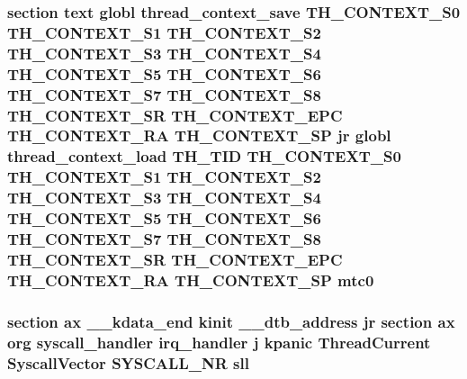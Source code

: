 \hypertarget{mips_2entry_8S_a586efcb1ce14274ebde0a48ee5903ea6}{
\subsubsection[{mtc0}]{\setlength{\rightskip}{0pt plus 5cm}section text globl {\bf thread\-\_\-context\-\_\-save} {\bf T\-H\-\_\-\-C\-O\-N\-T\-E\-X\-T\-\_\-\-S0} {\bf T\-H\-\_\-\-C\-O\-N\-T\-E\-X\-T\-\_\-\-S1} {\bf T\-H\-\_\-\-C\-O\-N\-T\-E\-X\-T\-\_\-\-S2} {\bf T\-H\-\_\-\-C\-O\-N\-T\-E\-X\-T\-\_\-\-S3} {\bf T\-H\-\_\-\-C\-O\-N\-T\-E\-X\-T\-\_\-\-S4} {\bf T\-H\-\_\-\-C\-O\-N\-T\-E\-X\-T\-\_\-\-S5} {\bf T\-H\-\_\-\-C\-O\-N\-T\-E\-X\-T\-\_\-\-S6} {\bf T\-H\-\_\-\-C\-O\-N\-T\-E\-X\-T\-\_\-\-S7} {\bf T\-H\-\_\-\-C\-O\-N\-T\-E\-X\-T\-\_\-\-S8} {\bf T\-H\-\_\-\-C\-O\-N\-T\-E\-X\-T\-\_\-\-S\-R} {\bf T\-H\-\_\-\-C\-O\-N\-T\-E\-X\-T\-\_\-\-E\-P\-C} {\bf T\-H\-\_\-\-C\-O\-N\-T\-E\-X\-T\-\_\-\-R\-A} {\bf T\-H\-\_\-\-C\-O\-N\-T\-E\-X\-T\-\_\-\-S\-P} jr globl {\bf thread\-\_\-context\-\_\-load} {\bf T\-H\-\_\-\-T\-I\-D} {\bf T\-H\-\_\-\-C\-O\-N\-T\-E\-X\-T\-\_\-\-S0} {\bf T\-H\-\_\-\-C\-O\-N\-T\-E\-X\-T\-\_\-\-S1} {\bf T\-H\-\_\-\-C\-O\-N\-T\-E\-X\-T\-\_\-\-S2} {\bf T\-H\-\_\-\-C\-O\-N\-T\-E\-X\-T\-\_\-\-S3} {\bf T\-H\-\_\-\-C\-O\-N\-T\-E\-X\-T\-\_\-\-S4} {\bf T\-H\-\_\-\-C\-O\-N\-T\-E\-X\-T\-\_\-\-S5} {\bf T\-H\-\_\-\-C\-O\-N\-T\-E\-X\-T\-\_\-\-S6} {\bf T\-H\-\_\-\-C\-O\-N\-T\-E\-X\-T\-\_\-\-S7} {\bf T\-H\-\_\-\-C\-O\-N\-T\-E\-X\-T\-\_\-\-S8} {\bf T\-H\-\_\-\-C\-O\-N\-T\-E\-X\-T\-\_\-\-S\-R} {\bf T\-H\-\_\-\-C\-O\-N\-T\-E\-X\-T\-\_\-\-E\-P\-C} {\bf T\-H\-\_\-\-C\-O\-N\-T\-E\-X\-T\-\_\-\-R\-A} {\bf T\-H\-\_\-\-C\-O\-N\-T\-E\-X\-T\-\_\-\-S\-P} mtc0}}\label{mips_2entry_8S_a586efcb1ce14274ebde0a48ee5903ea6}
\hypertarget{mips_2entry_8S_a7be273109aad6a792e6f802e2f94dd1e}{
\subsubsection[{sll}]{\setlength{\rightskip}{0pt plus 5cm}section ax {\bf \-\_\-\-\_\-kdata\-\_\-end} {\bf kinit} \-\_\-\-\_\-dtb\-\_\-address jr section ax org {\bf syscall\-\_\-handler} {\bf irq\-\_\-handler} j {\bf kpanic} {\bf Thread\-Current} {\bf Syscall\-Vector} {\bf S\-Y\-S\-C\-A\-L\-L\-\_\-\-N\-R} sll}}\label{mips_2entry_8S_a7be273109aad6a792e6f802e2f94dd1e}
